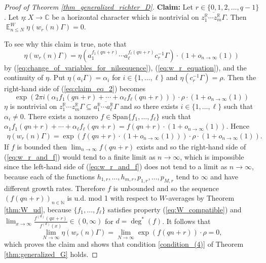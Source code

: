 \documentclass[12pt]{article}
\theoremstyle{plain} %
\theoremstyle{definition} %
\theoremstyle{plain}
\theoremstyle{plain}
\numberwithin{equation}{section}
\newcommand{\N}{\mathbb{N}}
\newcommand{\R}{\mathbb{R}}
\newcommand{\C}{\mathbb{C}}
\renewcommand{\leq}{\leqslant}
\renewcommand{\subset}{\subseteq}
\newcommand{\1}{\mathbbm{1}}
\newcommand{\E}{\operatorname{\mathbb{E}}}
\newcommand{\oo}{\infty}
\begin{document}
\begin{proof}[Proof of Theorem \ref{thm_generalized_richter_D}]
    
    \textbf{Claim:} Let $r\in \{0,1,2,\dots, q-1\}$. Let $\eta:X\rightarrow \C$ be a horizontal character which is nontrivial on $\overline{z_1^{\R}\cdots z_m^{\R}\Gamma}$. Then $\E_{n\leq N}^W\eta\left(w_r(n)
    \Gamma\right)=0.$
    
    To see why this claim is true, note that
    \begin{equation}\label{eq:claim_eq_2}
    \eta(w_r(n)\Gamma) = \eta(a_1^{f_1(qn+r)}\cdots a_{\ell}^{f_{\ell}(qn+r)}c_r^{-1}\Gamma)\cdot (1+o_{n\to\oo}(1))
    \end{equation}
     by (\ref{eq:change_of_variables_for_nilsequence}), (\ref{eq:w_r_equation}), and the continuity of $\eta$.
    Put $\eta(a_i\Gamma) = \alpha_i$ for $i\in \{1,\dots, \ell\}$ and $\eta(c_r^{-1}\Gamma) = \rho$. Then the right-hand side of (\ref{eq:claim_eq_2}) becomes
    $$
    \exp(2\pi i (\alpha_1 f_1(qn+r)+\cdots +\alpha_{\ell}f_{\ell}(qn+r)))\cdot \rho\cdot (1+o_{n\to\oo}(1))
    $$
    $\eta$ is nontrivial on $\overline{z_1^{\R}\cdots z_m^{\R}\Gamma}\subset \overline{a_1^{\R}\cdots a_{\ell}^{\R}\Gamma}$ and so there exists $i\in \{1,\dots, \ell\}$ such that $\alpha_i\neq 0$. There exists a nonzero $f\in \text{Span}\{f_1,\dots, f_{\ell}\}$ such that $\alpha_1f_1(qn+r)+\cdots +\alpha_{\ell}f_{\ell}(qn+r) = f(qn+r)\cdot (1+o_{n\to\oo}(1))$. Hence
    \begin{align}\label{eq:w_r_and_f}
   \eta(w_r(n)\Gamma) 
   = \exp(f(qn+r)\cdot (1+o_{n\to\oo}(1)))\cdot \rho \cdot (1+o_{n\to\oo}(1)).
    \end{align}
    If $f$ is bounded then $\lim_{n\to\oo}f(qn+r)$ exists and so the right-hand side of (\ref{eq:w_r_and_f}) would tend to a finite limit as $n\to\oo$, which is impossible since the left-hand side of (\ref{eq:w_r_and_f}) does not tend to a limit as $n\to\oo$, because each of the functions $h_{1,r},\dots, h_{m,r},p_{1,r},\dots, p_{M,r}$ tend to $\oo$ and have different growth rates. Therefore $f$ is unbounded and so the sequence $(f(qn+r))_{n\in \N}$ is u.d. mod 1 with respect to $W$-averages by Theorem \ref{thm:W_ud}, because $\{f_1,\dots, f_{\ell}\}$ satisfies property (\ref{eq:W_compatible}) and $\lim_{x\to\oo}\frac{f^{(d)}(qx+r)}{f^{(d)}(x)}\in (0,\oo)$ for $d=\deg^*(f)$. It follows that 
    $$
    \lim_{N\to\oo} \eta(w_r(n)\Gamma) 
   = \lim_{N\to\oo}\exp(f(qn+r))\cdot \rho =0,
    $$
    which proves the claim and shows that condition \ref{condition_(4)} of Theorem \ref{thm:generalized_G} holds.
   


\end{proof}
\end{document}
